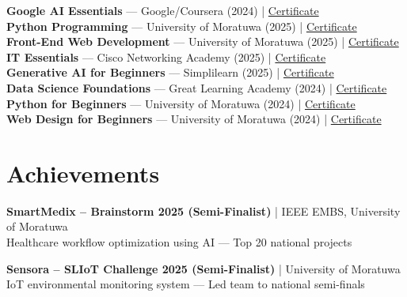 \documentclass[letterpaper,10pt]{article}
\begin{document}
\textbf{Google AI Essentials} — Google/Coursera (2024) | \href{https://coursera.org/verify/specialization/JZOWGO7JRRHB}{Certificate}\\
\textbf{Python Programming} — University of Moratuwa (2025) | \href{https://open.uom.lk/verify?code=VTmcj35vju}{Certificate}\\
\textbf{Front-End Web Development} — University of Moratuwa (2025) | \href{https://open.uom.lk/verify?code=BHzCLZLb5G}{Certificate}\\
\textbf{IT Essentials} — Cisco Networking Academy (2025) | \href{https://www.credly.com/badges/6111bbbe-db9e-438f-981d-c770b9fae03c}{Certificate}\\
\textbf{Generative AI for Beginners} — Simplilearn (2025) | \href{https://www.linkedin.com/in/vindya-kodithuwakku-bb6187202/details/certifications/1760065621808/}{Certificate}\\
\textbf{Data Science Foundations} — Great Learning Academy (2024) | \href{https://www.mygreatlearning.com/certificate/XGIRSIHP}{Certificate}\\
\textbf{Python for Beginners} — University of Moratuwa (2024) | \href{https://open.uom.lk/verify?code=xw4fpfB8ZS}{Certificate}\\
\textbf{Web Design for Beginners} — University of Moratuwa (2024) | \href{https://open.uom.lk/verify?code=kjyQ67aXNP}{Certificate}

\section{Achievements}
\vspace{-1pt}

\textbf{SmartMedix – Brainstorm 2025 (Semi-Finalist)} | IEEE EMBS, University of Moratuwa\\
Healthcare workflow optimization using AI — Top 20 national projects

\textbf{Sensora – SLIoT Challenge 2025 (Semi-Finalist)} | University of Moratuwa\\
IoT environmental monitoring system — Led team to national semi-finals

\end{document}

